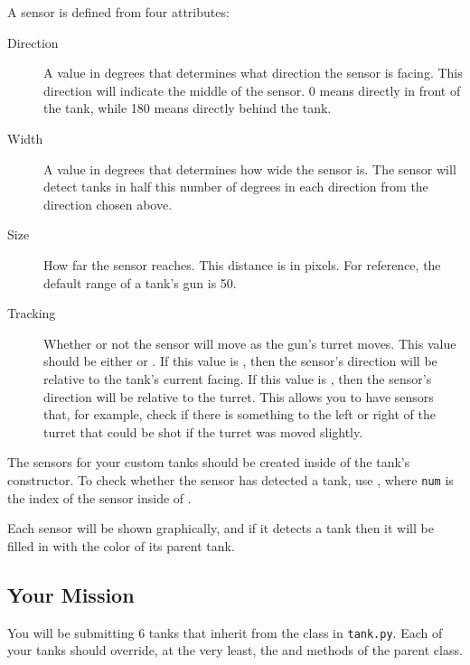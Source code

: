 \documentclass[11pt]{cselabheader}
\begin{document}
A sensor is defined from four attributes:
\begin{description}
\item[Direction] A value in degrees that determines what direction the sensor
    is facing. This direction will indicate the middle of the sensor. 0 means
    directly in front of the tank, while 180 means directly behind the tank.
\item[Width] A value in degrees that determines how wide the sensor is. The
    sensor will detect tanks in half this number of degrees in each direction
    from the direction chosen above.
\item[Size] How far the sensor reaches. This distance is in pixels. For
    reference, the default range of a tank's gun is 50.
\item[Tracking] Whether or not the sensor will move as the gun's turret moves.
    This value should be either  or . If
    this value is , then the sensor's direction will be
    relative to the tank's current facing. If this value is ,
    then the sensor's direction will be relative to the turret. This allows you
    to have sensors that, for example, check if there is something to the left
    or right of the turret that could be shot if the turret was moved slightly.
\end{description}

The sensors for your custom tanks should be created inside of the tank's
constructor. To check whether the sensor has detected a tank, use
, where \texttt{num} is the index of the
sensor inside of .

Each sensor will be shown graphically, and if it detects a tank then it will be
filled in with the color of its parent tank.



\pagebreak
\subsection{Your Mission}
\label{subsec:ex}
You will be submitting 6 tanks that inherit from the  class
in \texttt{tank.py}. Each of your tanks should override, at the very least,
the  and  methods of
the parent class.

\begin{ex}
\end{ex}
\end{document}
